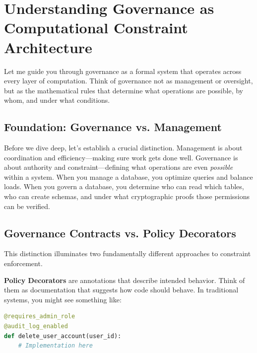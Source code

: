 
\section*{Understanding Governance as Computational Constraint Architecture}

Let me guide you through governance as a formal system that operates across every layer of computation. Think of governance not as management or oversight, but as the mathematical rules that determine what operations are possible, by whom, and under what conditions.

\subsection{Foundation: Governance vs. Management}

Before we dive deep, let's establish a crucial distinction. Management is about coordination and efficiency—making sure work gets done well. Governance is about authority and constraint—defining what operations are even \textit{possible} within a system. When you manage a database, you optimize queries and balance loads. When you govern a database, you determine who can read which tables, who can create schemas, and under what cryptographic proofs those permissions can be verified.

\subsection{Governance Contracts vs. Policy Decorators}

This distinction illuminates two fundamentally different approaches to constraint enforcement.

\textbf{Policy Decorators} are annotations that describe intended behavior. Think of them as documentation that suggests how code should behave. In traditional systems, you might see something like:

\begin{lstlisting}[language=Python]
@requires_admin_role
@audit_log_enabled  
def delete_user_account(user_id):
    # Implementation here
\end{lstlisting}

